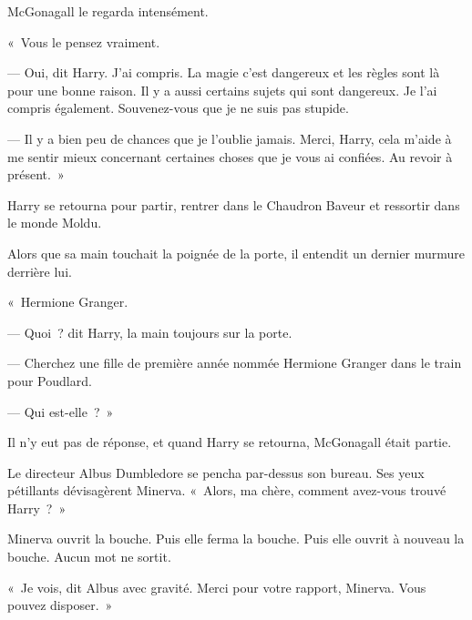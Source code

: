 McGonagall le regarda intensément.

«~Vous le pensez vraiment.

--- Oui, dit Harry. J'ai compris. La magie c'est dangereux et les règles sont là pour une bonne raison. Il y a aussi certains sujets qui sont dangereux.
Je l'ai compris également. Souvenez-vous que je ne suis pas stupide.

--- Il y a bien peu de chances que je l'oublie jamais. Merci, Harry, cela m'aide à me sentir mieux concernant certaines choses que je vous ai confiées. Au revoir à présent.~»

Harry se retourna pour partir, rentrer dans le Chaudron Baveur et ressortir dans le monde Moldu.

Alors que sa main touchait la poignée de la porte, il entendit un dernier murmure derrière lui.

«~Hermione Granger.

--- Quoi~? dit Harry, la main toujours sur la porte.

--- Cherchez une fille de première année nommée Hermione Granger dans le train pour Poudlard.

--- Qui est-elle~?~»

Il n'y eut pas de réponse, et quand Harry se retourna, McGonagall était partie.


Le directeur Albus Dumbledore se pencha par-dessus son bureau. Ses yeux pétillants dévisagèrent Minerva. «~Alors, ma chère, comment avez-vous trouvé Harry~?~»

Minerva ouvrit la bouche. Puis elle ferma la bouche. Puis elle ouvrit à nouveau la bouche. Aucun mot ne sortit.

«~Je vois, dit Albus avec gravité. Merci pour votre rapport, Minerva. Vous pouvez disposer.~»

